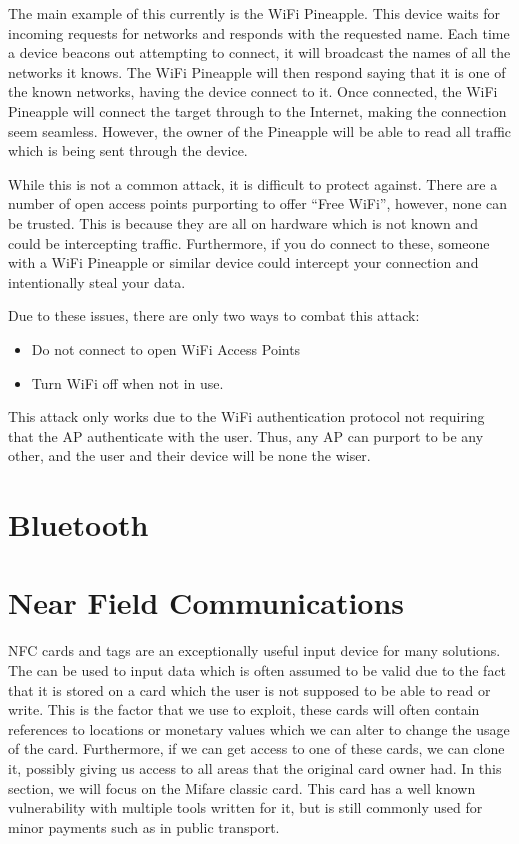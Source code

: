 \documentclass[a4paper,11pt]{report}
\begin{document}
			The main example of this currently is the WiFi Pineapple. 
			This device waits for incoming requests for networks and responds with the requested name. 
			Each time a device beacons out attempting to connect, it will broadcast the names of all the networks it knows. 
			The WiFi Pineapple will then respond saying that it is one of the known networks, having the device connect to it. 
			Once connected, the WiFi Pineapple will connect the target through to the Internet, making the connection seem seamless. 
			However, the owner of the Pineapple will be able to read all traffic which is being sent through the device. 

			While this is not a common attack, it is difficult to protect against. 
			There are a number of open access points purporting to offer ``Free WiFi'', however, none can be trusted. 
			This is because they are all on hardware which is not known and could be intercepting traffic. 
			Furthermore, if you do connect to these, someone with a WiFi Pineapple or similar device could intercept your connection and intentionally steal your data. 

			Due to these issues, there are only two ways to combat this attack:
			\begin{itemize}
				\item Do not connect to open WiFi Access Points
				\item Turn WiFi off when not in use. 
			\end{itemize}

			This attack only works due to the WiFi authentication protocol not requiring that the AP authenticate with the user. 
			Thus, any AP can purport to be any other, and the user and their device will be none the wiser. 
	\section{Bluetooth}
	\section{Near Field Communications}
		NFC cards and tags are an exceptionally useful input device for many solutions. 
		The can be used to input data which is often assumed to be valid due to the fact that it is stored on a card which the user is not supposed to be able to read or write. 
		This is the factor that we use to exploit, these cards will often contain references to locations or monetary values which we can alter to change the usage of the card. 
		Furthermore, if we can get access to one of these cards, we can clone it, possibly giving us access to all areas that the original card owner had. 
		In this section, we will focus on the Mifare classic card. 
		This card has a well known vulnerability with multiple tools written for it, but is still commonly used for minor payments such as in public transport. 
\end{document}
